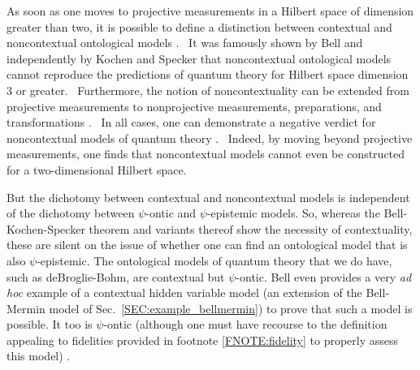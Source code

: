 \documentclass[aps,nofootinbib,12pt]{revtex4}
\begin{document}
As soon as one moves to projective measurements in a Hilbert space
of dimension greater than two, it is possible to define a
distinction between contextual and noncontextual ontological models
\cite{Spekkens_con}. \ It was famously shown by Bell
\cite{Bell_probhv} and independently by Kochen and Specker \cite{Ks}
that noncontextual ontological models cannot reproduce the
predictions of quantum theory for Hilbert space dimension 3 or
greater. \ Furthermore, the notion of noncontextuality can be
extended from projective measurements to nonprojective measurements,
preparations, and transformations \cite{Spekkens_con}. \ In all
cases, one can demonstrate a negative verdict for noncontextual
models of quantum theory \cite{Spekkens_con}. \ Indeed, by moving
beyond projective measurements, one finds that noncontextual models
cannot even be constructed for a two-dimensional Hilbert space.\

But the dichotomy between contextual and noncontextual models is
independent of the dichotomy between $\psi$-ontic and
$\psi$-epistemic models. So, whereas the Bell-Kochen-Specker theorem
and variants thereof show the necessity of contextuality, these are
silent on the issue of whether one can find an ontological model
that is also $\psi$-epistemic. The ontological models of quantum
theory that we do have, such as deBroglie-Bohm, are contextual but
$\psi$-ontic. Bell \cite{Bell_probhv} even provides a very \emph{ad
hoc} example of a contextual hidden variable model (an extension of
the Bell-Mermin model of Sec.~\ref{SEC:example_bellmermin}) to prove
that such a model is possible. It too is $\psi$-ontic (although one
must have recourse to the definition appealing to fidelities
provided in footnote \ref{FNOTE:fidelity} to properly assess this
model) \cite{Barrettpc}.
\end{document}
